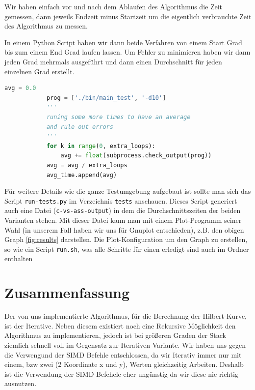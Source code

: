 \documentclass[course=erap]{aspdoc}
\begin{document}
Wir haben einfach vor und nach dem Ablaufen des Algorithmus die Zeit gemessen,
dann jeweils Endzeit minus Startzeit um die eigentlich verbrauchte Zeit des
Algorithmus zu messen.

In einem Python Script haben wir dann beide Verfahren von einem Start Grad bis
zum einem End Grad laufen lassen. Um Fehler zu minimieren haben wir dann jeden
Grad mehrmals ausgeführt und dann einen Durchschnitt für jeden einzelnen Grad
erstellt.

\begin{lstlisting}[language=python,caption={Durchschnittszeit Berechnung},belowcaptionskip=0.6cm]
            avg = 0.0
            prog = ['./bin/main_test', '-d10']
            '''
            runing some more times to have an average
            and rule out errors
            '''
            for k in range(0, extra_loops):
                avg += float(subprocess.check_output(prog))
            avg = avg / extra_loops
            avg_time.append(avg)
\end{lstlisting}
Für weitere Details wie die ganze Testumgebung aufgebaut ist sollte man sich
das Script \lstinline{run-tests.py} im Verzeichnis \lstinline{tests} anschauen.
Dieses Script generiert auch eine Datei (\lstinline{c-vs-ass-output}) in dem die
Durchschnittszeiten der beiden Varianten stehen. Mit dieser Datei kann man mit
einem Plot-Programm seiner Wahl (in unserem Fall haben wir uns für Gnuplot
entschieden), z.B. den obigen Graph \ref{fig:results} darstellen. Die
Plot-Konfiguration um den Graph zu erstellen, so wie ein Script
\lstinline{run.sh}, was alle Schritte für einen erledigt sind auch im Ordner
enthalten


\section{Zusammenfassung}
Der von uns implementierte Algorithmus, für die Berechnung der Hilbert-Kurve,
ist der Iterative.  Neben diesem existiert noch eine Rekursive Möglichkeit den
Algorithmus zu implementieren, jedoch ist bei größeren Graden der Stack
ziemlich schnell voll im Gegensatz zur Iterativen Variante. \newline
Wir haben uns gegen die Verwengund der SIMD Befehle entschlossen, da wir
Iterativ immer nur mit einem, bzw zwei (2 Koordinate x und y), Werten
gleichzeitig Arbeiten.  Deshalb ist die Verwendung der SIMD Befehele eher
ungünstig da wir diese nie richtig ausnutzen.

{}

\end{document}
